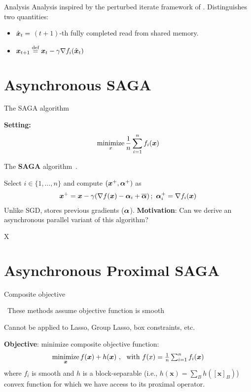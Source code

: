 \documentclass[10pt]{beamer}
\let\oldparencite=\parencite
\renewcommand{\parencite}[1]{\textcolor[rgb]{.7,.7,.7}{\oldparencite{#1}}}
\begin{document}
\begin{frame}{Analysis}
Analysis inspired by the perturbed iterate framework of \parencite{mania2015perturbed}. Distinguishes two quantities:
\begin{itemize}
\item $\hat{{\boldsymbol x}}_t =$ $(t+1)$-th fully completed read from shared memory. 
\item ${\boldsymbol x}_{t+1} \stackrel{\text{def}}{=} {\boldsymbol x}_{t} - \gamma \nabla f_i(\hat{{\boldsymbol x}}_t)$
\end{itemize}

\end{frame}

\section{Asynchronous SAGA}


\begin{frame}{The SAGA algorithm}

{\bfseries Setting:}
$$
\operatorname*{minimize}_x \frac{1}{n} \sum_{i=1}^n f_i({\boldsymbol x})
$$ 

The {\bfseries SAGA} algorithm~\parencite{defazio2014saga}.

Select $i \in \{1, \ldots, n\}$ and compute $({\boldsymbol x}^+, {\boldsymbol \alpha}^+)$ as
$$
{\boldsymbol x}^+ = {\boldsymbol x} - \gamma (\nabla f({\boldsymbol x}) - {\boldsymbol \alpha}_i + \overline{{\boldsymbol \alpha}})\,;~{\boldsymbol \alpha}_i^+ = \nabla f_i({\boldsymbol x})
$$
Unlike SGD, stores previous gradients (${\boldsymbol \alpha}$).
\vspace{1em}\pause
{\bfseries Motivation}: Can we derive an asynchronous parallel variant of this algorithm?
\end{frame}


\begin{frame}{X}
\end{frame}

\section{Asynchronous Proximal SAGA}



\begin{frame}{Composite objective}

\faExclamationTriangle~These methods assume objective function is smooth

Cannot be applied to Lasso, Group Lasso, box constraints, etc.

\pause 
\vspace{5mm}
{\bfseries Objective}: minimize composite objective function:
$$
\operatorname*{minimize}_{{\boldsymbol x}} f({\boldsymbol x}) + h({\boldsymbol x})~,~ \text{ with $f(x) = \textstyle \frac{1}{n}\sum_{i=1}^n f_i({\boldsymbol x})$}
$$
where $f_i$ is smooth and $h$ is a block-separable (i.e., $h(\boldsymbol{x}) = \sum_{B} h([\boldsymbol{x}]_B)$) convex function for which we have access to its proximal operator.
\end{frame}
\end{document}
